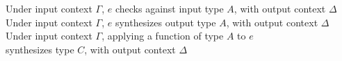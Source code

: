 \begin{figure*}[htbp]
     {Under input context $\Gamma$, $e$ checks against input type $A$, 
     with output context $\Delta$} \\[1ex]
     {Under input context $\Gamma$, $e$ synthesizes output type $A$,
       with output context $\Delta$} \\[1ex]
     {Under input context $\Gamma$, applying a function of type $A$ to $e$ \\synthesizes type $C$, with output context $\Delta$} \\
\end{figure*}
